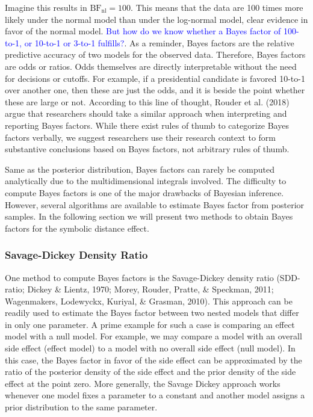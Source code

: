 \documentclass[
  english,
  doc,floatsintext]{apa6}
\begin{document}
Imagine this results in \(\text{BF}_{\text{nl}} = 100\). This means that the data are 100 times more likely under the normal model than under the log-normal model, clear evidence in favor of the normal model. \textcolor{blue}{But how do we know whether a Bayes factor of 100-to-1, or 10-to-1 or 3-to-1 fulfills?}. As a reminder, Bayes factors are the relative predictive accuracy of two models for the observed data. Therefore, Bayes factors are odds or ratios. Odds themselves are directly interpretable without the need for decisions or cutoffs. For example, if a presidential candidate is favored 10-to-1 over another one, then these are just the odds, and it is beside the point whether these are large or not. According to this line of thought, Rouder et al. (2018) argue that researchers should take a similar approach when interpreting and reporting Bayes factors. While there exist rules of thumb to categorize Bayes factors verbally, we suggest researchers use their research context to form substantive conclusions based on Bayes factors, not arbitrary rules of thumb.

Same as the posterior distribution, Bayes factors can rarely be computed analytically due to the multidimensional integrals involved. The difficulty to compute Bayes factors is one of the major drawbacks of Bayesian inference. However, several algorithms are available to estimate Bayes factor from posterior samples. In the following section we will present two methods to obtain Bayes factors for the symbolic distance effect.

\hypertarget{savage-dickey-density-ratio}{%
\subsubsection{Savage-Dickey Density Ratio}\label{savage-dickey-density-ratio}}

One method to compute Bayes factors is the Savage-Dickey density ratio (SDD-ratio; Dickey \& Lientz, 1970; Morey, Rouder, Pratte, \& Speckman, 2011; Wagenmakers, Lodewyckx, Kuriyal, \& Grasman, 2010). This approach can be readily used to estimate the Bayes factor between two nested models that differ in only one parameter. A prime example for such a case is comparing an effect model with a null model. For example, we may compare a model with an overall side effect (effect model) to a model with no overall side effect (null model). In this case, the Bayes factor in favor of the side effect can be approximated by the ratio of the posterior density of the side effect and the prior density of the side effect at the point zero. More generally, the Savage Dickey approach works whenever one model fixes a parameter to a constant and another model assigns a prior distribution to the same parameter.
\end{document}

